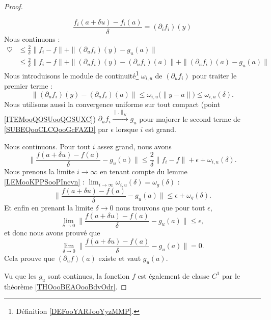 \begin{proof}
\begin{subproof}
		\begin{equation}
			\frac{ f_i(a+\delta u)-f_i(a) }{ \delta }=(\partial_if_i)(y)
		\end{equation}
		Nous continuons :
		\begin{subequations}
			\begin{align}
				\heartsuit & \leq\frac{ 2 }{ \delta }\| f_i-f \|+\| (\partial_uf_i)(y)-g_u(a) \|                                                                          \\
				           & \leq \frac{ 2 }{ \delta }\| f_i-f \|+\| (\partial_uf_i)(y)-(\partial_uf_i)(a) \|+\| (\partial_uf_i)(a)-g_u(a) \| \label{SUBEQooCLCQooGcFAZD}
			\end{align}
		\end{subequations}
		Nous introduisons le module de continuité\footnote{Définition \ref{DEFooYARJooYyzMMP}.} \( \omega_{i,u}\) de \( (\partial_uf_i)\) pour traiter le premier terme :
		\begin{equation}
			\| (\partial_uf_i)(y)-(\partial_uf_i)(a) \|\leq\omega_{i,u}\big( \| y-a \| \big)\leq \omega_{i,u}(\delta).
		\end{equation}
		Nous utilisons aussi la convergence uniforme sur tout compact (point \ref{ITEMooQOSUooQGSUXC}) \( \partial_uf_i\stackrel{\| . \|_K}{\longrightarrow}g_u\) pour majorer le second terme de \eqref{SUBEQooCLCQooGcFAZD} par \( \epsilon\) lorsque \( i\) est grand.

		Nous continuons. Pour tout \( i\) assez grand, nous avons
		\begin{equation}
			\| \frac{ f(a+\delta u)-f(a) }{ \delta }-g_u(a) \|\leq \frac{ 2 }{ \delta }\| f_i-f \|+\epsilon+\omega_{i,u}(\delta).
		\end{equation}
		Nous prenons la limite \( i\to \infty\) en tenant compte du lemme \ref{LEMooKPPSooPIncvn} : \( \lim_{i\to \infty} \omega_{i,u}(\delta)=\omega_g(\delta)\) :
		\begin{equation}
			\| \frac{ f(a+\delta u)-f(a) }{ \delta }-g_u(a) \|\leq \epsilon+\omega_g(\delta).
		\end{equation}
		Et enfin en prenant la limite \( \delta\to 0\) nous trouvons que pour tout \( \epsilon\),
		\begin{equation}
			\lim_{\delta\to 0} \| \frac{ f(a+\delta u)-f(a) }{ \delta }-g_u(a) \|\leq \epsilon,
		\end{equation}
		et donc nous avons prouvé que
		\begin{equation}
			\lim_{\delta\to 0} \| \frac{ f(a+\delta u)-f(a) }{ \delta }-g_u(a) \|=0.
		\end{equation}
		Cela prouve que \( (\partial_uf)(a)\) existe et vaut \( g_u(a)\).
	\end{subproof}
	Vu que les \( g_u\) sont continues, la fonction \( f\) est également de classe \( C^1\) par le théorème \ref{THOooBEAOooBdvOdr}.
\end{proof}


